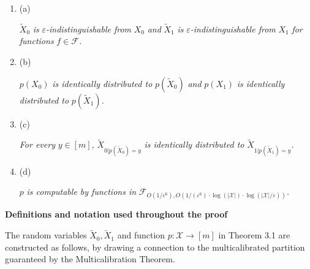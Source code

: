 \documentclass[10pt,a4paper]{article}
\begin{document}
\begin{enumerate}


\item[] 
(a) 


$\widetilde{X}_{0}$\emph{ is }$\varepsilon$\emph{-indistinguishable from }$X_{0}$\emph{ and }$\widetilde{X}_{1}$\emph{ is }$\varepsilon$\emph{-indistinguishable from }$X_{1}$\emph{ for functions }$f\in\mathcal{F}$\emph{.}\par





\item[] 
(b) 


$p(X_{0})$\emph{ is identically distributed to }$p(\widetilde{X}_{0})$\emph{ and }$p(X_{1})$\emph{ is identically distributed to }$p(\widetilde{X}_{1})$\emph{.}\par





\item[] 
(c) 


\emph{For every }$y\in[m]$\emph{, }$\widetilde{X}_{0|p(\widetilde{X}_{0})=y}$\emph{ is identically distributed to }$\widetilde{X}_{1|p(\widetilde{X}_{1})=y}$\emph{.}\par





\item[] 
(d) 


$p$\emph{ is computable by functions in }$\mathcal{F}_{O(1/\varepsilon^{6}),O(1/(\varepsilon^{6})\cdot\log(|\mathcal{X}|)\cdot\log(|\mathcal{X}|/\varepsilon))}$\emph{.}\par





\end{enumerate}







\par\medskip\noindent\textbf{Definitions and notation used throughout the proof}\par




The random variables $\widetilde{X}_{0},\widetilde{X}_{1}$ and function $p:\mathcal{X}\to[m]$ in Theorem 3.1 are constructed as follows, by drawing a connection to the multicalibrated partition guaranteed by the Multicalibration Theorem.\par
\end{document}
